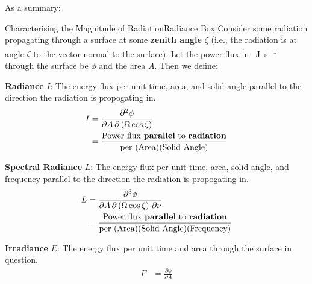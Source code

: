 As a summary:
\begin{fact}{Characterising the Magnitude of Radiation}{Radiance Box}\label{Radiance Box}
    Consider some radiation propagating through a surface at some \textbf{zenith angle} $\zeta$ (i.e., the radiation is at angle $\zeta$ to the vector normal to the surface). Let the power flux in \qty{}{\joule\per\second} through the surface be $\phi$ and the area $A$. Then we define:\vspace{3 mm}

    \begin{minipage}{.5\linewidth}
        \begin{tcolorbox}[colback=myyellow!50!white,colframe=mymagenta]
            \textbf{Radiance} $I$: The energy flux per unit time, area, and solid angle parallel to the direction the radiation is propogating in.
            \begin{align*}
                I&=\frac{\partial^2 \phi}{\partial A \, \partial \left( \Omega \cos\zeta  \right)}\\
                &=\frac{\text{Power flux \textbf{parallel} to \textbf{radiation}}}{\text{per }(\text{Area})(\text{Solid Angle})}
            \end{align*}
        \end{tcolorbox}
        \begin{tcolorbox}[colback=myyellow!50!white,colframe=mymagenta]
            \textbf{Spectral Radiance} $L$: The energy flux per unit time, area, solid angle, and frequency parallel to the direction the radiation is propogating in.
            \begin{align*}
                L&=\frac{\partial^3 \phi}{\partial A \, \partial \left( \Omega \cos\zeta  \right)\,\partial \nu}\\
                &=\frac{\text{Power flux \textbf{parallel} to \textbf{radiation}}}{\text{per }(\text{Area})(\text{Solid Angle})(\text{Frequency})}
            \end{align*}
        \end{tcolorbox}
    \end{minipage}
    \begin{minipage}{.5\linewidth}
        \begin{tcolorbox}[colback=myyellow!50!white,colframe=mymagenta]
            \textbf{Irradiance} $E$: The energy flux per unit time and area through the surface in question.
            \begin{align*}
                F&=\frac{\partial \phi}{\partial A}
                \\&

\end{align*}
\end{tcolorbox}
\end{minipage}
\end{fact}
